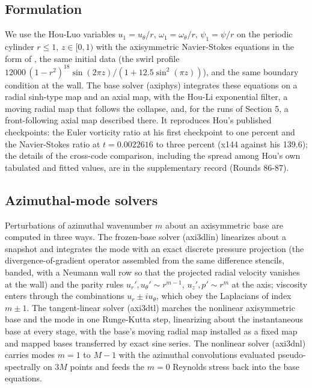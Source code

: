\documentclass[11pt]{article}
\begin{document}
\subsection{Formulation}

We use the Hou-Luo variables $u_1 = u_\theta / r$, $\omega_1 = \omega_\theta / r$, $\psi_1 = \psi / r$ on the periodic cylinder $r \le 1$, $z \in [0, 1)$ with the axisymmetric Navier-Stokes equations in the form of \cite{H23a,H23b}, the same initial data (the swirl profile $12000\,(1 - r^2)^{18} \sin(2 \pi z) / (1 + 12.5 \sin^2(\pi z))$), and the same boundary condition at the wall. The base solver (axiphys) integrates these equations on a radial sinh-type map and an axial map, with the Hou-Li exponential filter, a moving radial map that follows the collapse, and, for the runs of Section 5, a front-following axial map described there. It reproduces Hou's published checkpoints: the Euler vorticity ratio at his first checkpoint to one percent and the Navier-Stokes ratio at $t = 0.0022616$ to three percent (x144 against his 139.6); the details of the cross-code comparison, including the spread among Hou's own tabulated and fitted values, are in the supplementary record (Rounds 86-87).

\subsection{Azimuthal-mode solvers}

Perturbations of azimuthal wavenumber $m$ about an axisymmetric base are computed in three ways. The frozen-base solver (axi3dlin) linearizes about a snapshot and integrates the mode with an exact discrete pressure projection (the divergence-of-gradient operator assembled from the same difference stencils, banded, with a Neumann wall row so that the projected radial velocity vanishes at the wall) and the parity rules $u_r', u_\theta' \sim r^{m-1}$, $u_z', p' \sim r^m$ at the axis; viscosity enters through the combinations $u_r \pm i u_\theta$, which obey the Laplacians of index $m \pm 1$. The tangent-linear solver (axi3dtl) marches the nonlinear axisymmetric base and the mode in one Runge-Kutta step, linearizing about the instantaneous base at every stage, with the base's moving radial map installed as a fixed map and mapped bases transferred by exact sine series. The nonlinear solver (axi3dnl) carries modes $m = 1$ to $M - 1$ with the azimuthal convolutions evaluated pseudo-spectrally on $3M$ points and feeds the $m = 0$ Reynolds stress back into the base equations.
\end{document}
